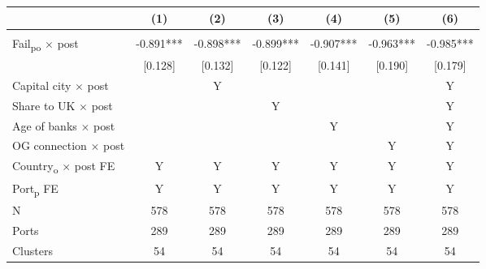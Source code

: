 {
\def\sym#1{\ifmmode^{#1}\else\(^{#1}\)\fi}
\begin{tabular}{l*{6}{c}}
\toprule
            &\multicolumn{1}{c}{(1)}   &\multicolumn{1}{c}{(2)}   &\multicolumn{1}{c}{(3)}   &\multicolumn{1}{c}{(4)}   &\multicolumn{1}{c}{(5)}   &\multicolumn{1}{c}{(6)}   \\
\midrule
            &               &               &               &               &               &               \\
Fail\textsubscript{po} $\times$ post&      -0.891***&      -0.898***&      -0.899***&      -0.907***&      -0.963***&      -0.985***\\
            &     [0.128]   &     [0.132]   &     [0.122]   &     [0.141]   &     [0.190]   &     [0.179]   \\
Capital city $\times$ post &               &           Y   &               &               &               &           Y   \\
Share to UK $\times$ post &               &               &           Y   &               &               &           Y   \\
Age of banks $\times$ post&               &               &               &           Y   &               &           Y   \\
OG connection $\times$ post&               &               &               &               &           Y   &           Y   \\
Country\textsubscript{o} $\times$ post FE&           Y   &           Y   &           Y   &           Y   &           Y   &           Y   \\
Port\textsubscript{p} FE &           Y   &           Y   &           Y   &           Y   &           Y   &           Y   \\
\midrule
N           &         578   &         578   &         578   &         578   &         578   &         578   \\
Ports       &         289   &         289   &         289   &         289   &         289   &         289   \\
Clusters    &          54   &          54   &          54   &          54   &          54   &          54   \\
\bottomrule
\end{tabular}
}
